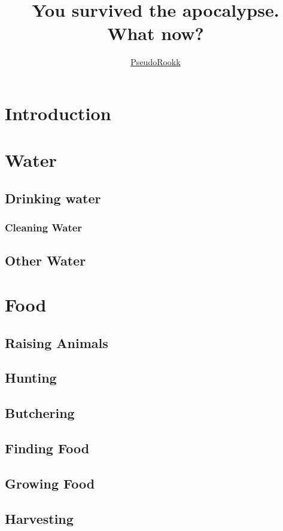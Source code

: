 \documentclass[ebook,12pt,oneside,openany]{memoir}
\title{You survived the apocalypse.\\ What now?}
\author{\href{https://github.com/PseudoRookk}{PseudoRookk}}
\begin{document}
\maketitle
\tableofcontents
\newpage


\chapter*{Introduction}
\blindtext



\chapter{Water}
\section{Drinking water}
\subsection{Cleaning Water}
\section{Other Water}



\chapter{Food}
\section{Raising Animals}
\section{Hunting}
\section{Butchering}

\section{Finding Food}
\section{Growing Food}
\section{Harvesting}
\end{document}
